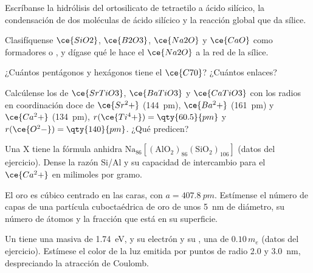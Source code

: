 \begin{exercise}[$\star$]\label{exo:b3:inorganic-materials:2}
Escríbanse la hidrólisis del ortosilicato de tetraetilo a ácido silícico, la
condensación de dos moléculas de ácido silícico y la reacción global que da
sílice.
\end{exercise}

\begin{exercise}[$\star$]\label{exo:b3:inorganic-materials:3}
Clasifíquense $\ce{SiO2}$, $\ce{B2O3}$, $\ce{Na2O}$ y $\ce{CaO}$ como formadores o , y dígase qué
le hace el $\ce{Na2O}$ a la red de la sílice.
\end{exercise}

\begin{exercise}[$\star$]\label{exo:b3:inorganic-materials:4}
¿Cuántos pentágonos y hexágonos tiene el $\ce{C70}$? ¿Cuántos enlaces?
\end{exercise}

\begin{exercise}[$\star\star$]\label{exo:b3:inorganic-materials:5}
Calcúlense los  de $\ce{SrTiO3}$, $\ce{BaTiO3}$ y $\ce{CaTiO3}$ con los radios en coordinación doce
de $\ce{Sr^2+}$ (\qty{144}{pm}), $\ce{Ba^2+}$ (\qty{161}{pm}) y $\ce{Ca^2+}$ (\qty{134}{pm}), $r(\ce{Ti^4+}) = \qty{60.5}{pm}$ y $r(\ce{O^2-}) = \qty{140}{pm}$. ¿Qué
predicen?
\end{exercise}

\begin{exercise}[$\star\star$]\label{exo:b3:inorganic-materials:6}
Una  X tiene la fórmula anhidra $\mathrm{Na_{86}[(AlO_2)_{86}(SiO_2)_{106}]}$ (datos del ejercicio).
Dense la razón Si/Al y su capacidad de intercambio para el $\ce{Ca^2+}$ en milimoles por gramo.
\end{exercise}

\begin{exercise}[$\star\star$]\label{exo:b3:inorganic-materials:7}
El oro es cúbico centrado en las caras, con $a = \qty{407.8}{pm}$. Estímense el número de capas de una
partícula cuboctaédrica de oro de unos \qty{5}{nm} de diámetro, su número de átomos y la
fracción que está en su superficie.
\end{exercise}

\begin{exercise}[$\star\star$]\label{exo:b3:inorganic-materials:8}
Un  tiene una  masiva de \qty{1.74}{eV}, y su electrón y su , una  de $0.10\,m_e$ (datos del ejercicio). Estímese el color de la luz emitida por
puntos de radio 2.0 y \qty{3.0}{nm}, despreciando la atracción de Coulomb.
\end{exercise}

